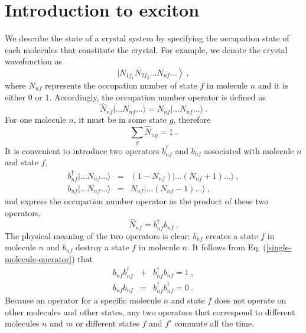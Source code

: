 \section{Introduction to exciton}
\label{sec: exciton}
We describe the state of a crystal system by specifying the occupation state of each molecules that constitute the crystal. For example, we denote the crystal wavefunction as
\begin{equation}
\left. |N_{1f_{1}} N_{2f_{2}} ...N_{nf} ... \right\rangle \nonumber \ ,
\end{equation}
where $N_{nf}$ represents the occupation number of state $f$ in molecule $n$ and it is either 0 or 1. Accordingly, the occupation number operator is defined as
\begin{equation}
\hat{N}_{nf} |...N_{nf}...\rangle = N_{nf} |...N_{nf}...\rangle \ .
\end{equation}
For one molecule $n$, it must be in some state $g$, therefore
\begin{equation}
\sum_{g}\hat{N}_{ng} = 1 \ . \label{must-be-in-a-state}
\end{equation}
It is convenient to introduce two operators $b_{nf}^{\dagger}$ and $b_{nf}$ associated with molecule $n$ and state $f$,
\begin{eqnarray}
b_{nf}^{\dagger} |...N_{nf}...\rangle &=& (1-N_{nf})|...(N_{nf}+1)...\rangle \ , \nonumber \\
b_{nf} |...N_{nf}...\rangle &=& N_{nf}|...(N_{nf}-1)...\rangle \ , \label{single-molecule-operator}
\end{eqnarray}
and express the occupation number operator as the product of these two operators,
\begin{equation}
\hat{N}_{nf} =b_{nf}^{\dagger} b_{nf} \ .
\end{equation}
The physical meaning of the two operators is clear: $b_{nf}$ creates a state $f$ in molecule $n$ and $b_{nf}$ destroy a state $f$ in molecule $n$.  It follows from Eq. (\ref{single-molecule-operator}) that
\begin{eqnarray}
b_{nf}b_{nf}^{\dagger} &+& b_{nf}^{\dagger}b_{nf} = 1 \ , \nonumber \\
b_{nf}b_{nf}&=&b_{nf}^{\dagger}b_{nf}^{\dagger} =0 \ . \label{commutation-relation-single-molecule}
\end{eqnarray}
Because an operator for a specific molecule $n$ and state $f$ does not operate on other molecules and other states, any two operators that correspond to different molecules $n$ and $m$ or different states $f$ and $f'$ commute all the time. 

